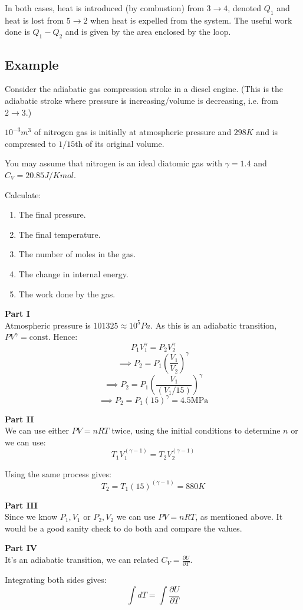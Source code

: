 In both cases, heat is introduced (by combustion) from $3 \to 4$, denoted $Q_1$ and heat is lost from $5 \to 2$ when heat is expelled from the system. The useful work done is $Q_1 - Q_2$ and is given by the area enclosed by the loop.

\subsection{Example}
Consider the adiabatic gas compression stroke in a diesel engine. (This is the adiabatic stroke where pressure is increasing/volume is decreasing, i.e. from $2 \to 3$.)

$10^{-3} \si{m^3}$ of nitrogen gas is initially at atmospheric pressure and $298 \si{K}$ and is compressed to $1/15$th of its original volume.

You may assume that nitrogen is an ideal diatomic gas with $\gamma=1.4$ and $C_V = 20.85 J/Kmol$.

Calculate:
\begin{enumerate}
    \item The final pressure.
    \item The final temperature.
    \item The number of moles in the gas.
    \item The change in internal energy.
    \item The work done by the gas.
\end{enumerate}

\textbf{Part I}\\
Atmospheric pressure is $101325 \approx 10^5\si{Pa}$. As this is an adiabatic transition, $PV^\gamma = \text{const}$. Hence:
\[
    P_1 V_1^\gamma = P_2 V_2^\gamma
\]
\[
    \implies P_2 = P_1 \left(\frac{V_1}{V_2}\right)^\gamma
\]
\[
    \implies P_2 = P_1 \left(\frac{V_1}{(V_1 / 15)}\right)^\gamma
\]
\[
    \implies P_2 = P_1 \left(15\right)^\gamma = 4.5 \si{\mega\pascal}
\]

\textbf{Part II}\\
We can use either $PV = nRT$ twice, using the initial conditions to determine $n$ or we can use:
\[
    T_1 V_1^{(\gamma - 1)} = T_2 V_2^{(\gamma - 1)}
\]

Using the same process gives:
\[
    T_2 = T_1 (15)^{(\gamma - 1)} = 880 \si{K}
\]

\textbf{Part III}\\
Since we know $P_1, V_1$ or $P_2, V_2$ we can use $PV = nRT$, as mentioned above. It would be a good sanity check to do both and compare the values. 

\textbf{Part IV}\\
It's an adiabatic transition, we can related $C_V = \frac{\partial U}{\partial T}$.

Integrating both sides gives:
\[
    \int dT = \int \frac{\partial U}{\partial T}
\]

